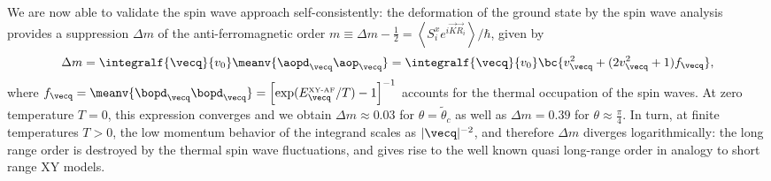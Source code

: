 We are now able to validate the spin wave approach self-consistently: the deformation of the ground state by the spin wave analysis
provides a suppression $\Delta m$ of the anti-ferromagnetic order $ m \equiv  \Delta m - \frac{1}{2}=\left\langle S^x_i e^{i {\vec K} {\vec R_i}} \right\rangle / \hbar$,
given by
%
\begin{align}
    \Delta m= \integralf{\vecq}{v_0} \meanv{ \aopd_{\vecq} \aop_{\vecq} } = \integralf{\vecq}{v_0}  \bc{ v_{\vecq}^2 + (2 v_{\vecq}^2 + 1) f_{\vecq} },
\end{align}
%
where $f_{\vecq} = \meanv{ \bopd_\vecq \bopd_\vecq } = \left[\exp(E^{\mbox{\tiny XY-AF}}_{\vecq}/ T)-1\right]^{-1}$ accounts for the thermal occupation of the spin waves. At zero temperature $T=0$, this expression converges and  we obtain $\Delta m \approx 0.03$ for $\theta = \tilde\theta_c$ as well as $\Delta m = 0.39$ for $\theta \approx \frac{\pi}{4}$. In turn, at finite temperatures $T>0$, the low momentum behavior of  the integrand scales as $|{\vecq}|^{-2}$, and therefore $\Delta m$ diverges logarithmically: the long range order is destroyed by the thermal spin wave fluctuations, and gives rise to the well known
quasi long-range order in analogy to short range XY models.

